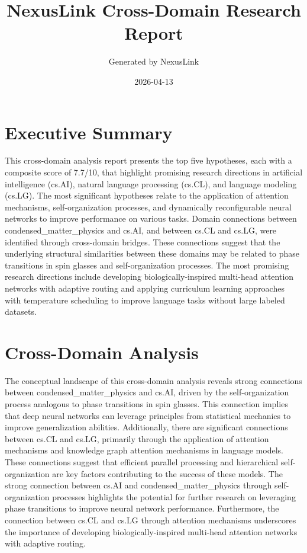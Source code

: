 \documentclass[12pt,a4paper]{article}
\title{NexusLink Cross-Domain Research Report}
\author{Generated by NexusLink}
\date{2026-04-13}
\begin{document}
\maketitle
\tableofcontents
\newpage

\section{Executive Summary}

This cross-domain analysis report presents the top five hypotheses, each with a composite score of 7.7/10, that highlight promising research directions in artificial intelligence (cs.AI), natural language processing (cs.CL), and language modeling (cs.LG). The most significant hypotheses relate to the application of attention mechanisms, self-organization processes, and dynamically reconfigurable neural networks to improve performance on various tasks. Domain connections between condensed\_matter\_physics and cs.AI, and between cs.CL and cs.LG, were identified through cross-domain bridges. These connections suggest that the underlying structural similarities between these domains may be related to phase transitions in spin glasses and self-organization processes. The most promising research directions include developing biologically-inspired multi-head attention networks with adaptive routing and applying curriculum learning approaches with temperature scheduling to improve language tasks without large labeled datasets.

\section{Cross-Domain Analysis}

The conceptual landscape of this cross-domain analysis reveals strong connections between condensed\_matter\_physics and cs.AI, driven by the self-organization process analogous to phase transitions in spin glasses. This connection implies that deep neural networks can leverage principles from statistical mechanics to improve generalization abilities. Additionally, there are significant connections between cs.CL and cs.LG, primarily through the application of attention mechanisms and knowledge graph attention mechanisms in language models. These connections suggest that efficient parallel processing and hierarchical self-organization are key factors contributing to the success of these models. The strong connection between cs.AI and condensed\_matter\_physics through self-organization processes highlights the potential for further research on leveraging phase transitions to improve neural network performance. Furthermore, the connection between cs.CL and cs.LG through attention mechanisms underscores the importance of developing biologically-inspired multi-head attention networks with adaptive routing.
\end{document}
